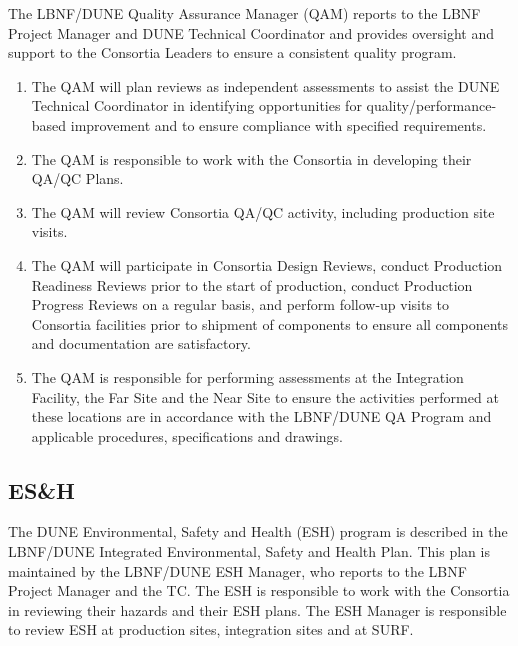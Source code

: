 The LBNF/DUNE Quality Assurance Manager (QAM) reports to the LBNF Project
Manager and DUNE Technical Coordinator and provides oversight and
support to the Consortia Leaders to ensure a consistent quality
program.
\begin{enumerate}
  \item The QAM will plan reviews as independent assessments to assist
    the DUNE Technical Coordinator in identifying opportunities for
    quality/performance-based improvement and to ensure compliance
    with specified requirements.
  \item The QAM is responsible to work with the Consortia in
    developing their QA/QC Plans.
  \item The QAM will review Consortia QA/QC activity, including
    production site visits.
  \item The QAM will participate in Consortia Design Reviews, conduct
    Production Readiness Reviews prior to the start of production,
    conduct Production Progress Reviews on a regular basis, and
    perform follow-up visits to Consortia facilities prior to shipment
    of components to ensure all components and documentation are
    satisfactory.
\item The QAM is responsible for performing assessments at the
  Integration Facility, the Far Site and the Near Site to
  ensure the activities performed at these locations are in accordance
  with the LBNF/DUNE QA Program and applicable procedures,
  specifications and drawings.
\end{enumerate}

\subsection{ES\&H}
\label{sec:fdsp-coord-esh}

The DUNE Environmental, Safety and Health (ESH) program is described
in the LBNF/DUNE Integrated Environmental, Safety and Health
Plan. This plan is maintained by the LBNF/DUNE ESH Manager, who
reports to the LBNF Project Manager and the TC. The ESH is responsible
to work with the Consortia in reviewing their hazards and their ESH
plans.  The ESH Manager is responsible to review ESH at production
sites, integration sites and at SURF.

